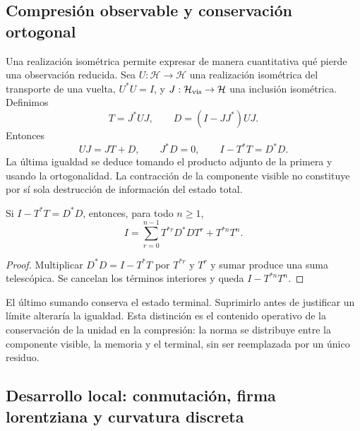 \subsection{Compresión observable y conservación ortogonal}

Una realización isométrica permite expresar de manera cuantitativa qué pierde una observación reducida. Sea \(U:\mathcal H\to\mathcal H\) una realización isométrica del transporte de una vuelta, \(U^*U=I\), y \(J:\mathcal H_{\rm vis}\to\mathcal H\) una inclusión isométrica. Definimos
\[
 T=J^*UJ,\qquad D=(I-JJ^*)UJ.
\]
Entonces
\begin{equation}
 UJ=JT+D,\qquad J^*D=0,\qquad I-T^*T=D^*D.
 \label{eq:conservacion-ortogonal}
\end{equation}
La última igualdad se deduce tomando el producto adjunto de la primera y usando la ortogonalidad. La contracción de la componente visible no constituye por sí sola destrucción de información del estado total.

\begin{proposition}
Si \(I-T^*T=D^*D\), entonces, para todo \(n\ge1\),
\begin{equation}
 I=\sum_{r=0}^{n-1}T^{*r}D^*DT^r+T^{*n}T^n.
 \label{eq:telescopia}
\end{equation}
\end{proposition}
\begin{proof}
Multiplicar \(D^*D=I-T^*T\) por \(T^{*r}\) y \(T^r\) y sumar produce una suma telescópica. Se cancelan los términos interiores y queda \(I-T^{*n}T^n\).
\end{proof}

El último sumando conserva el estado terminal. Suprimirlo antes de justificar un límite alteraría la igualdad. Esta distinción es el contenido operativo de la conservación de la unidad en la compresión: la norma se distribuye entre la componente visible, la memoria y el terminal, sin ser reemplazada por un único residuo.

\subsection{Desarrollo local: conmutación, firma lorentziana y curvatura discreta}

